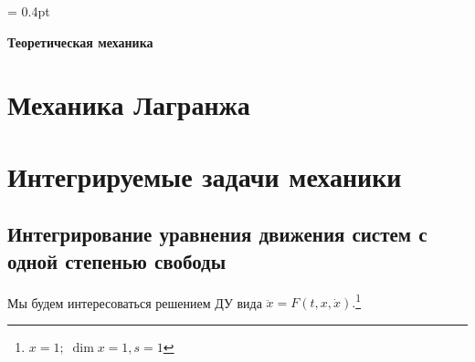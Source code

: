 \documentclass[12pt]{article}
\begin{document}
\renewcommand{\cftsecaftersnum}{.}
\renewcommand{\cftsubsecaftersnum}{.}

\renewcommand\refname{Список литературы}

\theoremstyle{plain}
\newtheorem{thm}{Теорема}[section]
\newtheorem{lem}[thm]{Лемма}
\newtheorem{pst}{Постулат}[section]

\theoremstyle{definition}
\newtheorem{dfn}{Определение}[section]
\newtheorem{cns}[thm]{Следствие}

\theoremstyle{remark}
\newtheorem{task}{Задача}[section]
\newtheorem{ex}{Пример}[subsection]
\newtheorem{cex}[ex]{Контрпример}
\newtheorem{rmk}{Замечание}[subsection]

\newcommand*{\eqdef}{\stackrel{\mathrm{def}}{=}}
\newcommand*{\is}[1]{\stackrel{\mathrm{\eqref{#1}}}{=}}
\newcommand*{\eqq}[1]{\stackrel{\mathrm{#1}}{=}}
\newcommand*{\hlf}{\frac{1}{2}}

\columnseprule = 0.4pt


\begin{center}
\Huge{\textbf{Теоретическая механика}}
\end{center}
\tableofcontents
\newpage

\section{Механика Лагранжа}

\newpage



\section{Интегрируемые задачи механики}
\subsection{Интегрирование уравнения движения систем с одной степенью свободы}
Мы будем интересоваться решением ДУ вида $\ddot{x} = F(t, x, \dot{x}).$\footnote{$x= 1;\; \dim x =1, s =1$}
\end{document}
